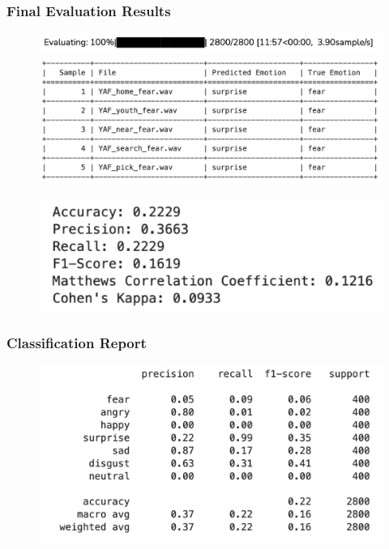 \documentclass[a4paper,12pt]{article}
\begin{document}
\subsubsection{Final Evaluation Results}
\begin{figure}[H]
    \centering
    \includegraphics[width=1\linewidth]{5331.png}
    \includegraphics[width=1\linewidth]{5322.png}
\end{figure}
\begin{figure}[H]
    \centering
    \includegraphics[width=1\linewidth]{5323.png}
\end{figure}
\subsubsection{Classification Report}
\begin{figure}[H]
    \centering
    \includegraphics[width=1\linewidth]{5324.png}
\end{figure}
\end{document}
